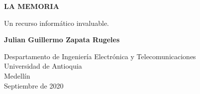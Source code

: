 \documentclass{article}
\begin{document}
\begin{titlepage}
    \begin{center}
        \vspace*{1cm}
            
        \Huge
        \textbf{LA MEMORIA}
            
        \vspace{0.5cm}
        \LARGE
        Un recurso informático invaluable.
        \vspace{1.5cm}
            
        \textbf{Julian Guillermo Zapata Rugeles}
            
        \vfill
            
        \vspace{0.8cm}
            
        \Large
        Despartamento de Ingeniería Electrónica y Telecomunicaciones\\
        Universidad de Antioquia\\
        Medellín\\
        Septiembre de 2020
            
    \end{center}
\end{titlepage}

\tableofcontents
\end{document}
